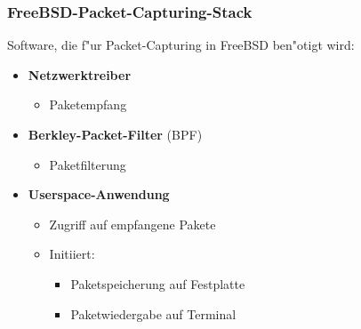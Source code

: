 \documentclass{beamer}
\begin{document}
\begin{frame}
\frametitle{FreeBSD-Packet-Capturing-Stack}
Software, die f"ur Packet-Capturing in FreeBSD ben"otigt wird: \newline
\begin{itemize}
	\item \textbf{Netzwerktreiber}
		\begin{itemize}
			\item Paketempfang
		\end{itemize}
	\item \textbf{Berkley-Packet-Filter} (BPF)
		\begin{itemize}
			\item Paketfilterung
		\end{itemize}
	\item \textbf{Userspace-Anwendung}
		\begin{itemize}
			\item Zugriff auf empfangene Pakete
			\item Initiiert:
				\begin{itemize}
					\item Paketspeicherung auf Festplatte
					\item Paketwiedergabe auf Terminal
				\end{itemize}
		\end{itemize}
\end{itemize}
\end{frame}
\end{document}
